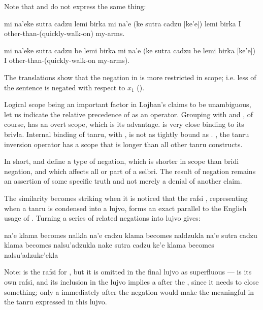 Note that  and  do not express the same
    thing:
\begin{example}
mi na'eke sutra cadzu  lemi birka\n
mi na'e (ke sutra cadzu [ke'e]) lemi birka\n
I other-than-(quickly-walk-on) my-arms.
\end{example}

\begin{example}
mi na'eke sutra cadzu be lemi birka \n
mi na'e (ke sutra cadzu be lemi birka [ke'e])\n
I other-than-(quickly-walk-on my-arms).
\end{example}

The translations show that the negation in  is more restricted in scope;
    i.e. less of the sentence is negated with respect to $x_1$
    ().

Logical scope being an important factor in Lojban's claims
    to be unambiguous, let us indicate the relative precedence of
     as an operator. Grouping with  and , of
    course, has an overt scope, which is its advantage.  is
    very close binding to its brivla. Internal binding of tanru,
    with , is not as tightly bound as . , the
    tanru inversion operator has a scope that is longer than all
    other tanru constructs.

In short,  and  define a type of negation,
    which is shorter in scope than bridi negation, and which
    affects all or part of a selbri. The result of 
    negation remains an assertion of some specific truth and not
    merely a denial of another claim.

The similarity becomes striking when it is noticed that the
    rafsi , representing  when a tanru is
    condensed into a lujvo, forms an exact parallel to the English
    usage of . Turning a series of related negations into
    lujvo gives:
\begin{example}
na'e klama becomes nalkla\n
na'e cadzu klama becomes naldzukla\n
na'e sutra cadzu klama becomes nalsu'adzukla\n
nake sutra cadzu ke'e klama becomes nalsu'adzuke'ekla
\end{example}

Note:  is the rafsi for , but it is omitted
    in the final lujvo as superfluous ---  is its own
    rafsi, and its inclusion in the lujvo implies a  after
    the , since it needs to close something; only a 
    immediately after the negation would make the 
    meaningful in the tanru expressed in this lujvo.

